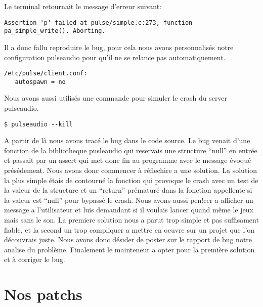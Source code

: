 \documentclass[12pt]{report}
\begin{document}
Le terminal retournait le message d'erreur suivant:
\begin{verbatim}
Assertion 'p' failed at pulse/simple.c:273, function pa_simple_write(). Aborting.
\end{verbatim}
Il a donc fallu reproduire le bug, pour cela nous avons personnalisés notre
configuration pulseaudio pour qu'il ne se relance pas automatiquement.
\begin{verbatim}
/etc/pulse/client.conf:
   autospawn = no
\end{verbatim}
Nous avons aussi utilisés une commande pour simuler le crash du server pulseaudio.
\begin{verbatim}
$ pulseaudio --kill
\end{verbatim}
A partir de là nous avons tracé le bug dans le code source. Le bug venait d'une
fonction de la bibliotheque pusleaudio qui reservais une structure ``null'' en
entrée et passait par un assert qui met donc fin au programme avec le message
évoqué présédement. Nous avons donc commencer à réflechire a une solution.
La solution la plus simple étais de contourné la fonction qui provoque le crash
avec un test de la valeur de la structure et un ``return'' prématuré dans la fonction
appellente si la valeur est ``null'' pour bypassé le crash. \newline
Nous avons aussi pen!cer a afficher un message a l'utilisateur et luis demandant
si il voulais lancer quand même le jeux mais sans le son. \newline
La premiere solution nous a parut trop simple et pas suffisament fiable, et la
second un trop compliquer a mettre en oeuvre sur un projet que l'on découvrais juste.
Nous avons donc désider de poster sur le rapport de bug notre analise du problème.
\newline
Finalement le mainteneur a opter pour la première solution et à
corriger le bug.

\section{Nos patchs}
\end{document}
